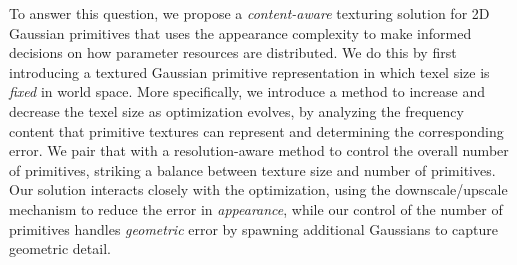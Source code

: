 To answer this question,
we propose a \emph{content-aware} texturing solution for 2D Gaussian primitives that uses the appearance complexity  to make informed decisions on how parameter resources
are distributed.
We do this by first introducing a textured Gaussian primitive representation in which texel size is \emph{fixed} in world space.
More specifically,
we introduce a method to increase and decrease the texel size as optimization evolves,
by analyzing the frequency content that primitive textures can represent and determining the corresponding error.
We pair that with a resolution-aware method to control the overall number of primitives,
striking a balance between texture size and number of primitives.
Our solution interacts closely with the optimization,
using the downscale/upscale mechanism to reduce the error in \emph{appearance},
while our control of the number of primitives handles \emph{geometric} error by spawning additional Gaussians to capture geometric detail.

%

